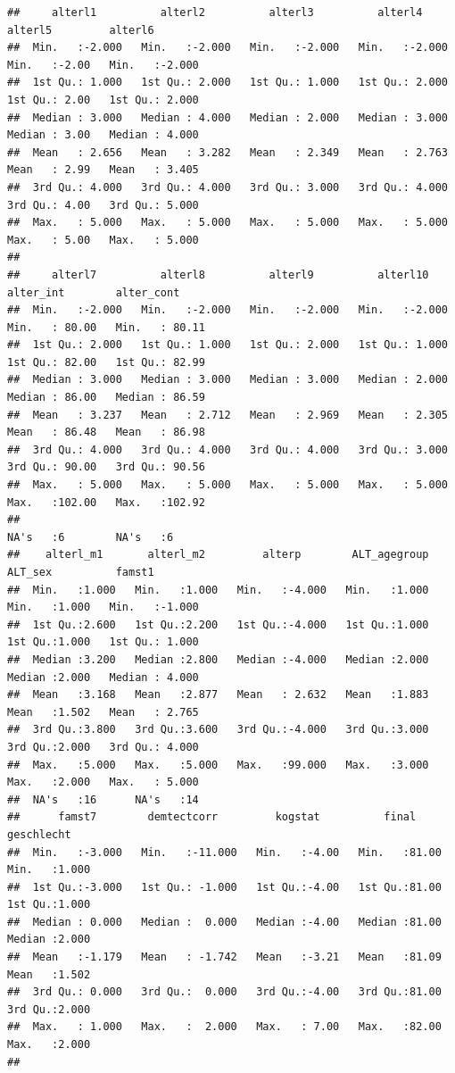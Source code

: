 \documentclass[
  doc]{apa6}
\begin{document}
\begin{verbatim}
##     alterl1          alterl2          alterl3          alterl4          alterl5         alterl6      
##  Min.   :-2.000   Min.   :-2.000   Min.   :-2.000   Min.   :-2.000   Min.   :-2.00   Min.   :-2.000  
##  1st Qu.: 1.000   1st Qu.: 2.000   1st Qu.: 1.000   1st Qu.: 2.000   1st Qu.: 2.00   1st Qu.: 2.000  
##  Median : 3.000   Median : 4.000   Median : 2.000   Median : 3.000   Median : 3.00   Median : 4.000  
##  Mean   : 2.656   Mean   : 3.282   Mean   : 2.349   Mean   : 2.763   Mean   : 2.99   Mean   : 3.405  
##  3rd Qu.: 4.000   3rd Qu.: 4.000   3rd Qu.: 3.000   3rd Qu.: 4.000   3rd Qu.: 4.00   3rd Qu.: 5.000  
##  Max.   : 5.000   Max.   : 5.000   Max.   : 5.000   Max.   : 5.000   Max.   : 5.00   Max.   : 5.000  
##                                                                                                      
##     alterl7          alterl8          alterl9          alterl10        alter_int        alter_cont    
##  Min.   :-2.000   Min.   :-2.000   Min.   :-2.000   Min.   :-2.000   Min.   : 80.00   Min.   : 80.11  
##  1st Qu.: 2.000   1st Qu.: 1.000   1st Qu.: 2.000   1st Qu.: 1.000   1st Qu.: 82.00   1st Qu.: 82.99  
##  Median : 3.000   Median : 3.000   Median : 3.000   Median : 2.000   Median : 86.00   Median : 86.59  
##  Mean   : 3.237   Mean   : 2.712   Mean   : 2.969   Mean   : 2.305   Mean   : 86.48   Mean   : 86.98  
##  3rd Qu.: 4.000   3rd Qu.: 4.000   3rd Qu.: 4.000   3rd Qu.: 3.000   3rd Qu.: 90.00   3rd Qu.: 90.56  
##  Max.   : 5.000   Max.   : 5.000   Max.   : 5.000   Max.   : 5.000   Max.   :102.00   Max.   :102.92  
##                                                                      NA's   :6        NA's   :6       
##    alterl_m1       alterl_m2         alterp        ALT_agegroup      ALT_sex          famst1      
##  Min.   :1.000   Min.   :1.000   Min.   :-4.000   Min.   :1.000   Min.   :1.000   Min.   :-1.000  
##  1st Qu.:2.600   1st Qu.:2.200   1st Qu.:-4.000   1st Qu.:1.000   1st Qu.:1.000   1st Qu.: 1.000  
##  Median :3.200   Median :2.800   Median :-4.000   Median :2.000   Median :2.000   Median : 4.000  
##  Mean   :3.168   Mean   :2.877   Mean   : 2.632   Mean   :1.883   Mean   :1.502   Mean   : 2.765  
##  3rd Qu.:3.800   3rd Qu.:3.600   3rd Qu.:-4.000   3rd Qu.:3.000   3rd Qu.:2.000   3rd Qu.: 4.000  
##  Max.   :5.000   Max.   :5.000   Max.   :99.000   Max.   :3.000   Max.   :2.000   Max.   : 5.000  
##  NA's   :16      NA's   :14                                                                       
##      famst7        demtectcorr         kogstat          final         geschlecht   
##  Min.   :-3.000   Min.   :-11.000   Min.   :-4.00   Min.   :81.00   Min.   :1.000  
##  1st Qu.:-3.000   1st Qu.: -1.000   1st Qu.:-4.00   1st Qu.:81.00   1st Qu.:1.000  
##  Median : 0.000   Median :  0.000   Median :-4.00   Median :81.00   Median :2.000  
##  Mean   :-1.179   Mean   : -1.742   Mean   :-3.21   Mean   :81.09   Mean   :1.502  
##  3rd Qu.: 0.000   3rd Qu.:  0.000   3rd Qu.:-4.00   3rd Qu.:81.00   3rd Qu.:2.000  
##  Max.   : 1.000   Max.   :  2.000   Max.   : 7.00   Max.   :82.00   Max.   :2.000  
## 
\end{verbatim}
\end{document}
